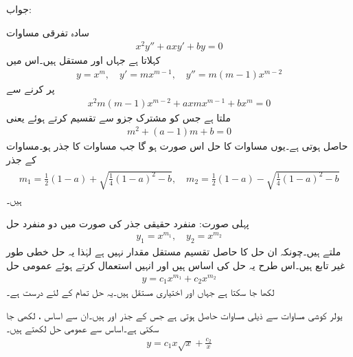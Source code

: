 جواب:

سادہ تفرقی مساوات 
\begin{align}\label{مساوات_سادہ_دو_درجی_یولر_کوشی_الف}
x^2y''+axy'+by=0
\end{align}
 کہلاتا ہے جہاں  اور  مستقل ہیں۔اس میں
\begin{align*}
y=x^m, \quad y'=mx^{m-1}, \quad y''=m(m-1)x^{m-2}
\end{align*}
پر کرنے سے
\begin{align*}
x^2m(m-1)x^{m-2}+axmx^{m-1}+bx^m=0
\end{align*}
ملتا ہے جس کو مشترک جزو  سے تقسیم کرتے ہوئے   یعنی
\begin{align}\label{مساوات_سادہ_دو_درجی_یولر_کوشی_ب}
m^2+(a-1)m+b=0
\end{align}
حاصل ہوتی ہے۔یوں  مساوات  کا حل اس صورت ہو گا جب  مساوات  کا جذر ہو۔مساوات  کے جذر
\begin{gather}
\begin{aligned}\label{مساوات_سادہ_دو_درجی_یولر_کوشی_پ}
m_1=\frac{1}{2}(1-a)+\sqrt{\frac{1}{4}(1-a)^2-b}, \quad m_2=\frac{1}{2}(1-a)-\sqrt{\frac{1}{4}(1-a)^2-b}
\end{aligned}
\end{gather}
ہیں۔

پہلی صورت: منفرد حقیقی جذر کی صورت میں دو منفرد حل 
\begin{align*}
y_1=x^{m_1},\quad y_2=x^{m_2}
\end{align*}
ملتے ہیں۔چونکہ ان حل کا حاصل تقسیم مستقل مقدار نہیں ہے لہٰذا یہ حل خطی طور غیر تابع ہیں۔اس طرح یہ حل کی اساس ہیں اور انہیں استعمال کرتے ہوئے عمومی حل
\begin{align}
y=c_1x^{m_1}+c_2x^{m_2}
\end{align}
لکھا جا سکتا ہے جہاں  اور  اختیاری مستقل ہیں۔یہ حل تمام  کے لئے درست ہے۔

یولر کوشی مساوات  سے  ذیلی مساوات حاصل ہوتی ہے جس کے جذر  اور  ہیں۔ان سے اساس ،  لکھی جا سکتی ہے۔اساس سے عمومی حل لکھتے ہیں۔
\begin{align*}
y=c_1x\sqrt{x}+\frac{c_2}{x}
\end{align*}

